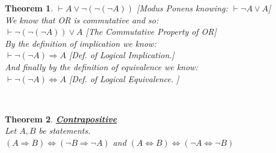 \documentclass[12pt]{extarticle}
\theoremstyle{plain}
\newtheorem{thm}{Theorem}[section]
\theoremstyle{plain}
\theoremstyle{plain}
\theoremstyle{Definition}
\theoremstyle{Definition}
\theoremstyle{plain}
\theoremstyle{plain}
\newcommand{\cut}[0]{\noindent\framebox[\linewidth]{\rule{\linewidth}{2pt}}\\}
\begin{document}
\begin{thm}
	$\vdash A \lor \lnot (\lnot (\lnot A))  $ \hfill [Modus Ponens knowing: $\vdash \lnot A \lor A $]\\	
	We know that OR is commutative and so: \\ 
	$\vdash \lnot (\lnot (\lnot A))  \lor A$ \hfill [The Commutative Property of OR]\\
	By the definition of implication we know: \\ 
	$\vdash \lnot (\lnot A) \Rightarrow A$ \hfill [Def. of Logical Implication.]\\
	And finally by the definition of equivalence we know: \\ 
	$\vdash \lnot (\lnot A) \Leftrightarrow A$	\hfill [Def. of Logical Equivalence. ]
\end{thm}
\cut
\begin{thm} \underline{\textbf{Contrapositive}} \\ 
	Let $A,B$ be statements. \\ 
	$(A \Rightarrow B) \Leftrightarrow (\lnot B \Rightarrow \lnot A)$ and $(A \Leftrightarrow B) \Leftrightarrow (\lnot A \Leftrightarrow \lnot B)$ 
\end{thm}
\cut 
\end{document}
